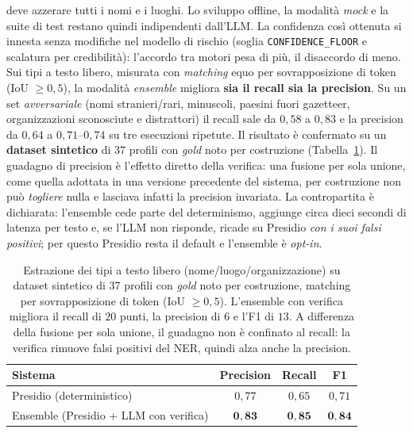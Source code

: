 \documentclass[11pt,a4paper]{article}
\begin{document}
deve azzerare tutti i nomi e i luoghi. Lo sviluppo offline, la modalità \emph{mock} e la
suite di test restano quindi indipendenti dall'LLM. La confidenza così
ottenuta si innesta senza modifiche nel modello di rischio (soglia \texttt{CONFIDENCE\_FLOOR}
e scalatura per credibilità): l'accordo tra motori pesa di più, il disaccordo di meno.
Sui tipi a testo libero, misurata con \emph{matching} equo per sovrapposizione di token
(IoU $\geq 0{,}5$), la modalità \emph{ensemble} migliora \textbf{sia il recall sia la
precision}. Su un set \emph{avversariale} (nomi stranieri/rari, minuscoli, paesini fuori
gazetteer, organizzazioni sconosciute e distrattori) il recall sale da $0{,}58$ a $0{,}83$
e la precision da $0{,}64$ a $0{,}71$--$0{,}74$ su tre esecuzioni ripetute. Il risultato è
confermato su un \textbf{dataset sintetico} di $37$ profili con \emph{gold} noto per
costruzione (Tabella~\ref{tab:eval-ensemble}). Il guadagno di precision è l'effetto diretto
della verifica: una fusione per sola unione, come quella adottata in una versione
precedente del sistema, per costruzione non può \emph{togliere} nulla e lasciava infatti la
precision invariata. La contropartita è dichiarata: l'ensemble cede parte del determinismo,
aggiunge circa dieci secondi di latenza per testo e, se l'LLM non risponde, ricade su
Presidio \emph{con i suoi falsi positivi}; per questo Presidio resta il default e
l'ensemble è \emph{opt-in}.

\begin{table}[htbp]
\centering\footnotesize
\renewcommand{\arraystretch}{1.2}
\begin{tabular}{lccc}
\toprule
\textbf{Sistema} & \textbf{Precision} & \textbf{Recall} & \textbf{F1} \\
\midrule
Presidio (deterministico)               & $0{,}77$ & $0{,}65$ & $0{,}71$ \\
Ensemble (Presidio + LLM con verifica)  & $\mathbf{0{,}83}$ & $\mathbf{0{,}85}$ & $\mathbf{0{,}84}$ \\
\bottomrule
\end{tabular}
\caption{Estrazione dei tipi a testo libero (nome/luogo/organizzazione) su dataset sintetico
di 37 profili con \emph{gold} noto per costruzione, matching per sovrapposizione di token
(IoU $\geq 0{,}5$). L'ensemble con verifica migliora il recall di $20$ punti, la precision
di $6$ e l'F1 di $13$. A differenza della fusione per sola unione, il guadagno non è
confinato al recall: la verifica rimuove falsi positivi del NER, quindi alza anche la
precision.}
\label{tab:eval-ensemble}
\end{table}
\end{document}
